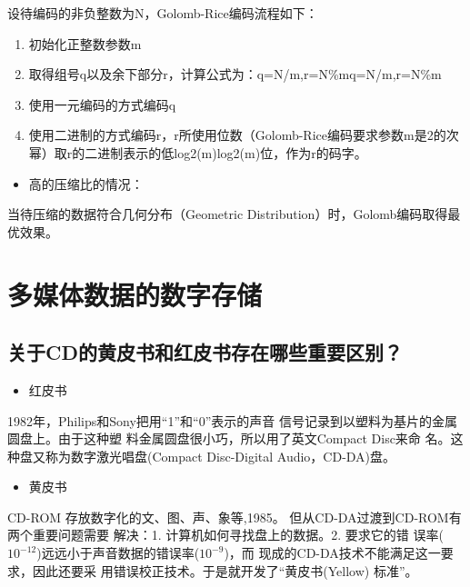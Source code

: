 \documentclass[UTF8,a4paper,AutoFakeBold,AutoFakeSlant]{ctexart}
\begin{document}
设待编码的非负整数为N，Golomb-Rice编码流程如下：
\begin{enumerate}
	\item 初始化正整数参数m
	\item 取得组号q以及余下部分r，计算公式为：q=N/m,r=N\%mq=N/m,r=N\%m
	\item 使用一元编码的方式编码q
	\item 使用二进制的方式编码r，r所使用位数（Golomb-Rice编码要求参数m是2的次幂）取r的二进制表示的低log2(m)log2⁡(m)位，作为r的码字。
\end{enumerate}

\begin{itemize}
	\item 高的压缩比的情况：
\end{itemize}
当待压缩的数据符合几何分布（Geometric Distribution）时，Golomb编码取得最优效果。









\section{多媒体数据的数字存储}

\subsection{关于CD的黄皮书和红皮书存在哪些重要区别？}

\begin{itemize}
	\item 红皮书
\end{itemize}

1982年，Philips和Sony把用“1”和“0”表示的声音
信号记录到以塑料为基片的金属圆盘上。由于这种塑
料金属圆盘很小巧，所以用了英文Compact Disc来命
名。这种盘又称为数字激光唱盘(Compact Disc-Digital 
Audio，CD-DA)盘。

\begin{itemize}
	\item 黄皮书
\end{itemize}

CD-ROM 存放数字化的文、图、声、象等,1985。
但从CD-DA过渡到CD-ROM有两个重要问题需要
解决：1. 计算机如何寻找盘上的数据。2. 要求它的错
误率($10^{-12}$)远远小于声音数据的错误率($10^{-9}$)，而
现成的CD-DA技术不能满足这一要求，因此还要采
用错误校正技术。于是就开发了“黄皮书(Yellow)
标准”。
\end{document}
